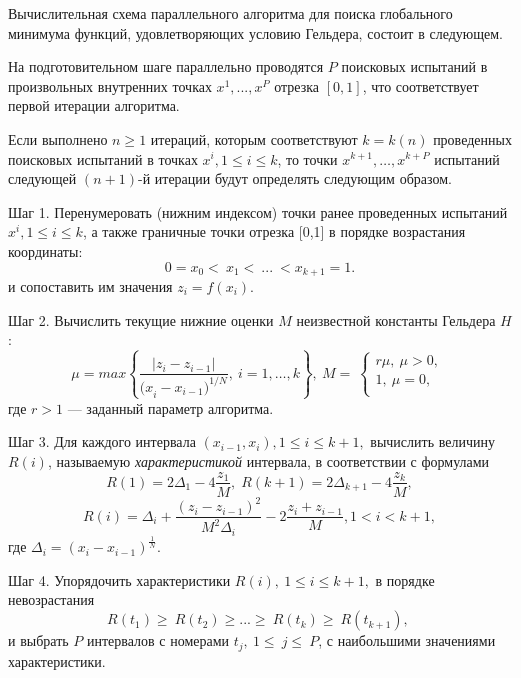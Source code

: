 \documentclass[10pt,a4paper]{book}
\begin{document}
Вычислительная схема параллельного алгоритма для поиска глобального минимума функций, удовлетворяющих условию Гельдера, состоит в следующем.

На подготовительном шаге параллельно проводятся $P$ поисковых испытаний в произвольных внутренних точках $x^1, ...,x^P$ отрезка $[0,1]$, что соответствует первой итерации  алгоритма. 

Если выполнено $n\geq1$ итераций, которым соответствуют $k=k(n)$ проведенных поисковых испытаний в точках $x^i, 1\leq i\leq k$, то точки $x^{k+1},\ldots,x^{k+P}$ испытаний следующей $(n+1)$-й итерации будут определять следующим образом.

 Шаг 1. Перенумеровать (нижним индексом) точки ранее проведенных испытаний $x^i, 1\leq i\leq k$, а также граничные точки отрезка [0,1] в порядке возрастания координаты:
 \begin{equation}
\label{agp1_sort}
	0=x_0<\ x_1<\ ...\ <x_{k+1}=1.
	\end{equation}
	и сопоставить им значения $z_i=f(x_i)$. 
	
Шаг 2. Вычислить текущие нижние оценки $M$ неизвестной константы Гельдера $H$:
 \begin{equation}
\label{agp2_mu}
	\mu=max\left\{\frac{|z_i-z_{i-1}|}{{{(x}_i-x_{i-1})}^{1/N}},\ i=1,\ldots,k\right\},\ M=\ \left\{\begin{matrix}r\mu,\ \mu>0,\\1,\ \mu=0,\\\end{matrix}\right.\
	\end{equation}
где $r>1$ --- заданный параметр алгоритма.
   
Шаг 3. Для каждого интервала $(x_{i-1},x_i), 1\leq i\leq k+1,$ вычислить величину $R(i)$, называемую \textit{характеристикой} интервала, в соответствии с формулами
\begin{equation}
\label{agp3_R1}
R(1)=2\Delta_1-4\dfrac{z_1}{M}, \; R(k+1)=2\Delta_{k+1}-4\dfrac{z_k}{M},
\end{equation}
\begin{equation}
\label{agp3_Ri}
R(i)=\Delta_i+\dfrac{(z_i-z_{i-1})^2}{M^2\Delta_i}-2\dfrac{z_i+z_{i-1}}{M},1<i<k+1,
\end{equation}
где \(\Delta_i=(x_i-x_{i-1})^\frac{1}{N}\).
   
Шаг 4.  Упорядочить характеристики $R\left(i\right),\ 1\leq i \leq k+1,$ в порядке невозрастания 
\begin{equation}
\label{agp4_R_sort}
	R\left(t_1\right)\geq\ R\left(t_2\right)\geq...\geq\ R\left(t_k\right)\geq\ R(t_{k+1}),\ 
\end{equation}	
и выбрать $P$ интервалов с номерами $t_j,\ 1\le\ j\le\ P$, с наибольшими значениями характеристики.
\end{document}
